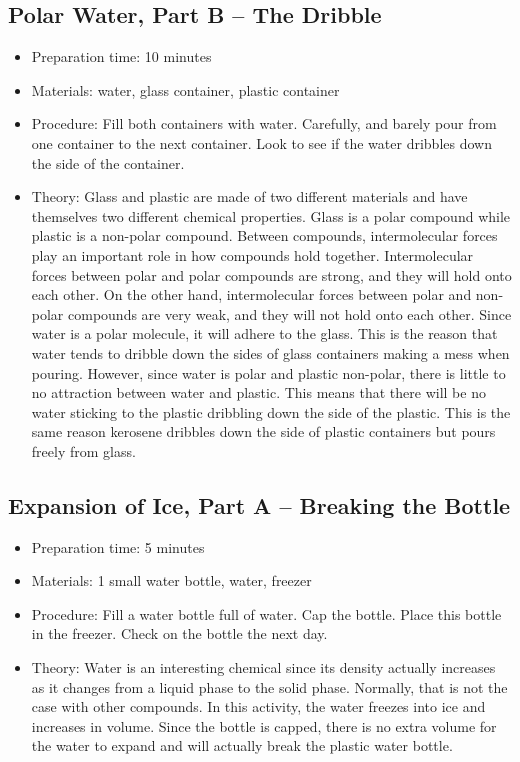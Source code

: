 \subsection{Polar Water, Part B – The Dribble}
\begin{itemize}
\item{Preparation time: 10 minutes}
\item{Materials: water, glass container, plastic container}
\item{Procedure: Fill both containers with water. Carefully, and barely pour from one container to the next container. Look to see if the water dribbles down the side of the container.}
\item{Theory: Glass and plastic are made of two different materials and have themselves two different chemical properties. Glass is a polar compound while plastic is a non-polar compound. Between compounds, intermolecular forces play an important role in how compounds hold together. Intermolecular forces between polar and polar compounds are strong, and they will hold onto each other. On the other hand, intermolecular forces between polar and non-polar compounds are very weak, and they will not hold onto each other. Since water is a polar molecule, it will adhere to the glass. This is the reason that water tends to dribble down the sides of glass containers making a mess when pouring. However, since water is polar and plastic non-polar, there is little to no attraction between water and plastic. This means that there will be no water sticking to the plastic dribbling down the side of the plastic. This is the same reason kerosene dribbles down the side of plastic containers but pours freely from glass.}
\end{itemize}

\subsection{Expansion of Ice, Part A – Breaking the Bottle}
\begin{itemize}
\item{Preparation time: 5 minutes}
\item{Materials: 1 small water bottle, water, freezer}
\item{Procedure: Fill a water bottle full of water. Cap the bottle. Place this bottle in the freezer. Check on the bottle the next day.}
\item{Theory: Water is an interesting chemical since its density actually increases as it changes from a liquid phase to the solid phase. Normally, that is not the case with other compounds. In this activity, the water freezes into ice and increases in volume. Since the bottle is capped, there is no extra volume for the water to expand and will actually break the plastic water bottle. }
\end{itemize}

